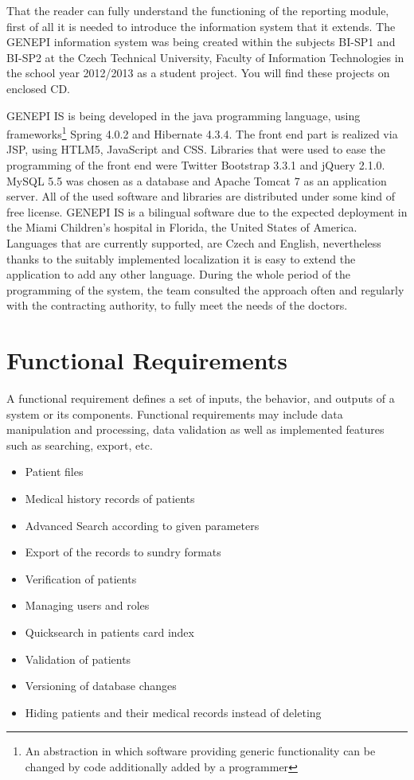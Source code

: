 \documentclass[thesis=B,english]{FITthesis}[2012/10/20]
\begin{document}
That the reader can fully understand the functioning of the reporting module, first of all it is needed to introduce the information system that it extends. The GENEPI information system was being created within the subjects BI-SP1 and BI-SP2 at the Czech Technical University, Faculty of Information Technologies in the school year 2012/2013 as a student project. You will find these projects on enclosed CD.

GENEPI IS is being developed in the java programming language, using frameworks\footnote{An abstraction in which software providing generic functionality can be changed by code additionally added by a programmer}  Spring 4.0.2 and Hibernate 4.3.4. The front end part is realized via JSP, using HTLM5, JavaScript and CSS. Libraries that were used to ease the programming of the front end were Twitter Bootstrap 3.3.1 and jQuery 2.1.0.  MySQL 5.5 was chosen as a database and  Apache Tomcat 7 as an application server. All of the used software and libraries are distributed under some kind of free license. GENEPI IS is a bilingual software due to the expected deployment in the Miami Children's hospital in Florida, the United States of America. Languages that are currently supported, are Czech and English, nevertheless thanks to the suitably implemented localization it is easy to extend the application to add any other language. During the whole period of the programming of the system, the team consulted the approach often  and regularly with the contracting authority, to fully meet the needs of the doctors.

\section{Functional Requirements}
A functional requirement defines a set of inputs, the behavior, and outputs of a system or its components. Functional requirements may include data manipulation and processing, data validation as well as implemented features such as searching, export, etc.
\begin{itemize}
  \item Patient files
  \item Medical history records of patients
  \item Advanced Search according to given parameters
  \item Export of the records to sundry formats
  \item Verification of patients
  \item Managing users and roles
  \item Quicksearch in patients card index
  \item Validation of patients
  \item Versioning of database changes
  \item Hiding patients and their medical records instead of deleting
\end{itemize}
\end{document}
